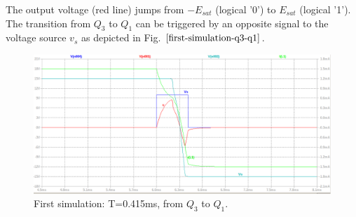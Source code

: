 \documentclass[letterpaper,11pt]{article}
\begin{document}
The output voltage (red line) jumps from $-E_{sat}$ (logical '0') to $E_{sat}$ (logical '1').\\
The transition from $Q_3$ to $Q_1$ can be triggered by an opposite signal to the voltage source $v_s$ as depicted in Fig. $\ref{first-simulation-q3-q1}$.
%
\begin{figure}[!ht]
        \centering \includegraphics[width=0.8\columnwidth]{first-simulation-Q3-Q1.png}
        \caption{\label{first-simulation-q3-q1}First simulation: T=0.415ms, from $Q_3$ to $Q_1$.
        }
\end{figure}
%
\clearpage
%
\newpage
%
\end{document}
